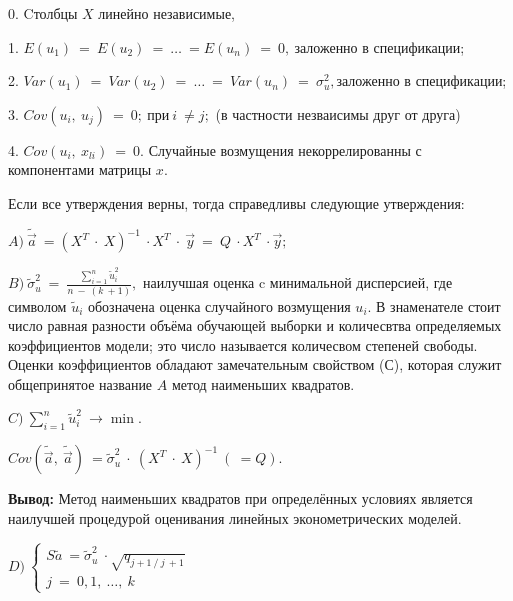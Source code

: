 \documentclass[12pt,a4paper]{article}
\begin{document}
	0. Cтолбцы $\displaystyle X$ линейно независимые,

	1. $\displaystyle E( u_{1}) \ =\ E( u_{2}) \ =\ \dotsc \ =E( u_{n}) \ =\ 0,\ $заложенно в спецификации;

	2. $\displaystyle Var( u_{1}) \ =\ Var( u_{2}) \ =\ \dotsc \ =\ Var( u_{n}) \ =\ \sigma ^{2}_{u} ,$заложенно в спецификации;

	3. $\displaystyle Cov( u_{i} ,\ u_{j}) \ =\ 0;\ \text{при} \ i\ \neq j;$ (в частности незваисимы друг от друга)

	4. $\displaystyle Cov( u_{i} ,\ x_{li}) \ =\ 0$. Случайные возмущения некоррелированны с компонентами матрицы $\displaystyle x$.

	Если все утверждения верны, тогда справедливы следующие утверждения:

$\displaystyle A) \ \widetilde{\vec{a}} \ =\left( X^{T} \ \cdot \ X\right)^{-1} \ \cdot X^{T} \ \cdot \ \vec{y} \ =\ Q\ \cdot X^{T} \ \cdot \vec{y} ;$

$\displaystyle B) \ \tilde{\sigma }^{2}_{u} \ =\ \frac{{\displaystyle \sum ^{n}_{i=1}\tilde{u}^{2}_{i}}}{n\ -\ ( k\ +1)} ,$ наилучшая оценка c минимальной дисперсией, где символом $\displaystyle \tilde{u}_{i}$ обозначена оценка случайного возмущения $\displaystyle u_{i}$. В знаменателе стоит число равная разности объёма обучающей выборки и количесвтва определяемых коэффициентов модели; это число называется количесвом степеней свободы. Оценки коэффициентов обладают замечательным свойством (С), которая служит общепринятое название $\displaystyle A$ метод наименьших квадратов.

$\displaystyle C) \ {\displaystyle \sum ^{n}_{i=1}\tilde{u}^{2}_{i} \ \rightarrow \min .}$

$\displaystyle Cov\left(\widetilde{\vec{a}} ,\ \widetilde{\vec{a}}\right) \ =\tilde{\sigma }^{2}_{u} \ \cdot \ $$\displaystyle \left( X^{T} \ \cdot \ X\right)^{-1} \ ( \ =Q)$.

\textbf{Вывод:} Метод наименьших квадратов при определённых условиях является наилучшей процедурой оценивания линейных эконометрических моделей.

$\displaystyle D) \ \begin{cases}
S\tilde{a} \ =\tilde{\sigma }^{2}_{u} \ \cdot \sqrt{q_{j+1\ /\ j\ +1}} \ \\
j\ =\ 0,1,\ \dotsc ,\ k
\end{cases}$
\end{document}
